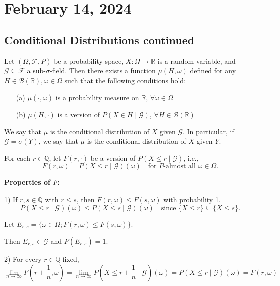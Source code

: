 \newpage
\section{February 14, 2024}
\subsection{Conditional Distributions continued}
\begin{theorem}
Let \((\Omega, \mathcal{F}, P)\) be a probability space, \(X: \Omega \to \mathbb{R}\) is a random variable, and \(\mathcal{G} \subseteq \mathcal{F}\) a sub-\(\sigma\)-field. Then there exists a function \(\mu(H, \omega)\) defined for any \(H \in \mathcal{B}(\mathbb{R}), \omega \in \Omega\) such that the following conditions hold:
\begin{itemize}
    \item[(a)] \(\mu(\cdot, \omega)\) is a probability measure on \(\mathbb{R}\), \(\forall \omega \in \Omega\)
    \item[(b)] \(\mu(H, \cdot)\) is a version of \(P(X \in H \mid \mathcal{G})\), \(\forall H \in \mathcal{B}(\mathbb{R})\)
\end{itemize}

We say that \(\mu\) is the conditional distribution of \(X\) given \(\mathcal{G}\). In particular, if \(\mathcal{G} = \sigma(Y)\), we say that \(\mu\) is the conditional distribution of \(X\) given \(Y\).
\end{theorem}



For each \(r \in \mathbb{Q}\), let \(F(r, \cdot)\) be a version of \(P(X \leq r \mid \mathcal{G})\), i.e.,
\[
F(r, \omega) = P(X \leq r \mid \mathcal{G})(\omega) \quad \text{for } P\text{-almost all } \omega \in \Omega.
\]

\textbf{Properties of \(F\):}

1) If \(r, s \in \mathbb{Q}\) with \(r \leq s\), then \(F(r, \omega) \leq F(s, \omega)\) with probability 1.
\[
P(X \leq r \mid \mathcal{G})(\omega) \leq P(X \leq s \mid \mathcal{G})(\omega) \quad \text{since } \{X \leq r\} \subseteq \{X \leq s\}.
\]

Let \(E_{r,s} = \{\omega \in \Omega; F(r, \omega) \leq F(s, \omega)\}\).

Then \(E_{r,s} \in \mathcal{G}\) and \(P(E_{r,s}) = 1\).

2) For every \(r \in \mathbb{Q}\) fixed,
\[
\lim_{n \to \infty} F\left(r + \frac{1}{n}, \omega\right) = \lim_{n \to \infty} P\left(X \leq r + \frac{1}{n} \mid \mathcal{G}\right)(\omega) = P(X \leq r \mid \mathcal{G})(\omega) = F(r, \omega)
\]

